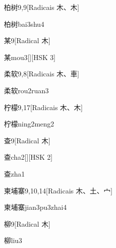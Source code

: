 \begin{entry}{柏树}{9,9}[Radicais ⽊、⽊]
  \begin{phonetics}{柏树}{bai3shu4}
  \end{phonetics}
\end{entry}

\begin{entry}{某}{9}[Radical ⽊]
  \begin{phonetics}{某}{mou3}[][HSK 3]
  \end{phonetics}
\end{entry}

\begin{entry}{柔软}{9,8}[Radicais ⽊、⾞]
  \begin{phonetics}{柔软}{rou2ruan3}
  \end{phonetics}
\end{entry}

\begin{entry}{柠檬}{9,17}[Radicais ⽊、⽊]
  \begin{phonetics}{柠檬}{ning2meng2}
  \end{phonetics}
\end{entry}

\begin{entry}{查}{9}[Radical ⽊]
  \begin{phonetics}{查}{cha2}[][HSK 2]
  \end{phonetics}
  \begin{phonetics}{查}{zha1}
  \end{phonetics}
\end{entry}

\begin{entry}{柬埔寨}{9,10,14}[Radicais ⽊、⼟、⼧]
  \begin{phonetics}{柬埔寨}{jian3pu3zhai4}
  \end{phonetics}
\end{entry}

\begin{entry}{柳}{9}[Radical ⽊]
  \begin{phonetics}{柳}{liu3}
  \end{phonetics}
\end{entry}

